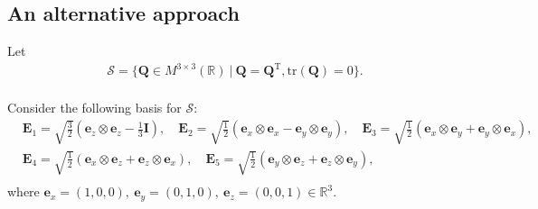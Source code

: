 \documentclass[10pt, a4paper]{article}
\newcommand\n{\mathbf{n}}
\newcommand\e{\mathbf{e}}
\newcommand\x{\mathbf{x}}
\newcommand\Qvec{\mathbf{Q}}
\newcommand\E{\mathbf{E}}
\newcommand\tr{\mathrm{tr}}
\begin{document}
\subsection{An alternative approach}
 \label{sec:dimension_reduction}


Let
\begin{equation}
  \begin{aligned}
    \mathcal{S} = \{ \Qvec \in M^{3\times3} (\mathbb{R}) ~|~ \Qvec = \Qvec^{\mathrm{T}}, \tr(\Qvec) = 0 \}. \\
   \end{aligned}
\end{equation}

Consider the following %
basis for $\mathcal{S}$: %
\begin{equation}
\begin{aligned}
& \E_1 = \sqrt{\frac{3}{2}}(\mathbf{e}_z \otimes \mathbf{e}_z - \frac{1}{3} \mathbf{I}), \quad \E_2 = \sqrt{\frac{1}{2}}(\mathbf{e}_x \otimes \mathbf{e}_x - \mathbf{e}_y \otimes \mathbf{e}_y), \quad \E_3 = \sqrt{\frac{1}{2}}(\mathbf{e}_x \otimes \mathbf{e}_y + \mathbf{e}_y \otimes \mathbf{e}_x), \\
& \E_4 = \sqrt{\frac{1}{2}}(\mathbf{e}_x \otimes \mathbf{e}_z + \mathbf{e}_z \otimes \mathbf{e}_x), \quad \E_5 = \sqrt{\frac{1}{2}}(\mathbf{e}_y \otimes \mathbf{e}_z + \mathbf{e}_z \otimes \mathbf{e}_y), \\
\end{aligned}
\end{equation}
where $\e_x = (1, 0, 0),~ \e_y = (0, 1, 0),~ \e_z = (0, 0, 1) \in \mathbb{R}^3$.
\end{document}
